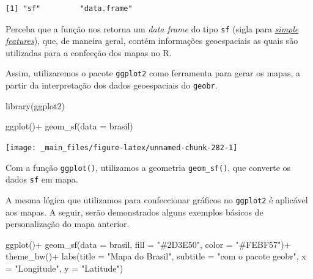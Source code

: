 \documentclass[
  brazilian,
]{book}
\newenvironment{Shaded}{\begin{snugshade}}{\end{snugshade}}
\newcommand{\AttributeTok}[1]{\textcolor[rgb]{0.77,0.63,0.00}{#1}}
\newcommand{\FunctionTok}[1]{\textcolor[rgb]{0.00,0.00,0.00}{#1}}
\newcommand{\NormalTok}[1]{#1}
\newcommand{\SpecialCharTok}[1]{\textcolor[rgb]{0.00,0.00,0.00}{#1}}
\newcommand{\StringTok}[1]{\textcolor[rgb]{0.31,0.60,0.02}{#1}}
\begin{document}
\begin{verbatim}
[1] "sf"         "data.frame"
\end{verbatim}

Perceba que a função nos retorna um \emph{data frame} do tipo \texttt{sf} (sigla para \href{https://r-spatial.github.io/sf/articles/sf1.html}{\emph{simple features}}), que, de maneira geral, contém informações geoespaciais as quais são utilizadas para a confecção dos mapas no R.

Assim, utilizaremos o pacote \texttt{ggplot2} como ferramenta para gerar os mapas, a partir da interpretação dos dados geoespaciais do \texttt{geobr}.

\begin{Shaded}
\begin{Highlighting}[]
\FunctionTok{library}\NormalTok{(ggplot2)}
\end{Highlighting}
\end{Shaded}

\begin{Shaded}
\begin{Highlighting}[]
\FunctionTok{ggplot}\NormalTok{()}\SpecialCharTok{+}
  \FunctionTok{geom\_sf}\NormalTok{(}\AttributeTok{data =}\NormalTok{ brasil)}
\end{Highlighting}
\end{Shaded}

\begin{center}\texttt{[image: \_main\_files/figure-latex/unnamed-chunk-282-1]} \end{center}

Com a função \texttt{ggplot()}, utilizamos a geometria \texttt{geom\_sf()}, que converte os dados \texttt{sf} em mapa.

A mesma lógica que utilizamos para confeccionar gráficos no \texttt{ggplot2} é aplicável aos mapas. A seguir, serão demonstrados alguns exemplos básicos de personalização do mapa anterior.

\begin{Shaded}
\begin{Highlighting}[]
\FunctionTok{ggplot}\NormalTok{()}\SpecialCharTok{+}
  \FunctionTok{geom\_sf}\NormalTok{(}\AttributeTok{data =}\NormalTok{ brasil,}
          \AttributeTok{fill =} \StringTok{"\#2D3E50"}\NormalTok{,}
          \AttributeTok{color =} \StringTok{"\#FEBF57"}\NormalTok{)}\SpecialCharTok{+}
  \FunctionTok{theme\_bw}\NormalTok{()}\SpecialCharTok{+}
  \FunctionTok{labs}\NormalTok{(}\AttributeTok{title =} \StringTok{"Mapa do Brasil"}\NormalTok{,}
       \AttributeTok{subtitle =} \StringTok{"com o pacote geobr"}\NormalTok{,}
       \AttributeTok{x =} \StringTok{"Longitude"}\NormalTok{,}
       \AttributeTok{y =} \StringTok{"Latitude"}\NormalTok{)}
\end{Highlighting}
\end{Shaded}
\end{document}
